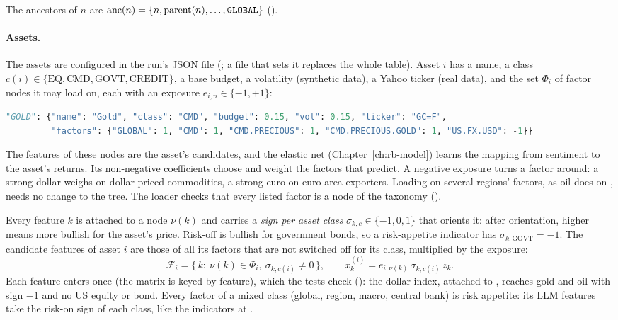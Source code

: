 The ancestors of $n$ are $\operatorname{anc}(n)=\{n,\text{parent}(n),\dots,\texttt{GLOBAL}\}$ ().

\paragraph{Assets.} The assets are configured in the run's JSON file (; a file that sets it replaces
the whole table). Asset $i$ has a name, a class $c(i)\in\{\mathrm{EQ},\mathrm{CMD},\mathrm{GOVT},\mathrm{CREDIT}\}$, a
base budget, a volatility (synthetic data), a Yahoo ticker (real data), and the set $\Phi_i$ of factor nodes it
may load on, each with an exposure $e_{i,n}\in\{-1,+1\}$:
\begin{lstlisting}[language=Python]
"GOLD": {"name": "Gold", "class": "CMD", "budget": 0.15, "vol": 0.15, "ticker": "GC=F",
         "factors": {"GLOBAL": 1, "CMD": 1, "CMD.PRECIOUS": 1, "CMD.PRECIOUS.GOLD": 1, "US.FX.USD": -1}}
\end{lstlisting}
The features of these nodes are the asset's candidates, and the elastic net (Chapter~\ref{ch:rb-model}) learns the
mapping from sentiment to the asset's returns. Its non-negative coefficients choose and weight the factors that
predict. A negative exposure turns a factor around: a strong dollar weighs on dollar-priced commodities, a strong
euro on euro-area exporters. Loading on several regions' factors, as oil does on , needs no
change to the tree. The loader checks that every listed factor is a node of the taxonomy ().

Every feature $k$ is attached to a node $\nu(k)$ and carries a \emph{sign per asset class} $\sigma_{k,c}\in\{-1,0,1\}$
that orients it: after orientation, higher means more bullish for the asset's price. Risk-off is bullish for
government bonds, so a risk-appetite indicator has $\sigma_{k,\mathrm{GOVT}}=-1$. The candidate features of asset
$i$ are those of all its factors that are not switched off for its class, multiplied by the exposure:
\[
  \mathcal F_i=\{\,k:\ \nu(k)\in\Phi_i,\ \sigma_{k,c(i)}\ne0\,\},\qquad x^{(i)}_k=e_{i,\nu(k)}\,\sigma_{k,c(i)}\,z_k.
\]
Each feature enters once (the matrix is keyed by feature), which the tests check
(): the dollar index, attached to ,
reaches gold and oil with sign $-1$ and no US equity or bond.
Every factor of a mixed class (global, region, macro, central bank) is risk appetite: its LLM features take the
risk-on sign of each class, like the indicators at .

